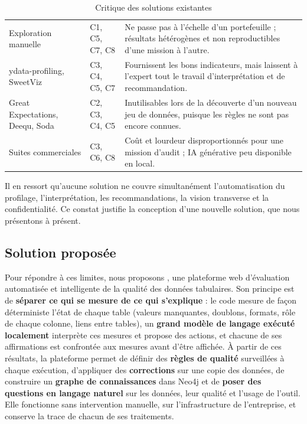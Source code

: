 \begin{table}[H]
\centering
\small
\begin{tabular}{|L{3.4cm}|L{2.6cm}|L{8cm}|}
\hline
{} &  &  \\ \hline
Exploration manuelle & C1, C5, C7, C8 & Ne passe pas à l'échelle d'un portefeuille ; résultats hétérogènes et non reproductibles d'une mission à l'autre. \\ \hline
ydata-profiling, SweetViz & C3, C4, C5, C7 & Fournissent les bons indicateurs, mais laissent à l'expert tout le travail d'interprétation et de recommandation. \\ \hline
Great Expectations, Deequ, Soda & C2, C3, C4, C5 & Inutilisables lors de la découverte d'un nouveau jeu de données, puisque les règles ne sont pas encore connues. \\ \hline
Suites commerciales & C3, C6, C8 & Coût et lourdeur disproportionnés pour une mission d'audit ; IA générative peu disponible en local. \\ \hline
\end{tabular}
\caption{Critique des solutions existantes}
\label{tab:critique}
\end{table}

Il en ressort qu'aucune solution ne couvre simultanément l'automatisation du profilage, l'interprétation, les recommandations, la vision transverse et la confidentialité. Ce constat justifie la conception d'une nouvelle solution, que nous présentons à présent.

\subsection{Solution proposée}

Pour répondre à ces limites, nous proposons \textbf{\projet}, une plateforme web d'évaluation automatisée et intelligente de la qualité des données tabulaires. Son principe est de \textbf{séparer ce qui se mesure de ce qui s'explique} : le code mesure de façon déterministe l'état de chaque table (valeurs manquantes, doublons, formats, rôle de chaque colonne, liens entre tables), un \textbf{grand modèle de langage exécuté localement} interprète ces mesures et propose des actions, et chacune de ses affirmations est confrontée aux mesures avant d'être affichée. À partir de ces résultats, la plateforme permet de définir des \textbf{règles de qualité} surveillées à chaque exécution, d'appliquer des \textbf{corrections} sur une copie des données, de construire un \textbf{graphe de connaissances} dans Neo4j et de \textbf{poser des questions en langage naturel} sur les données, leur qualité et l'usage de l'outil. Elle fonctionne sans intervention manuelle, sur l'infrastructure de l'entreprise, et conserve la trace de chacun de ses traitements.

